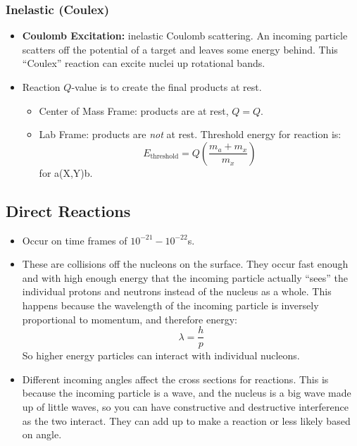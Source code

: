 \documentclass[letter]{article}
\begin{document}
\subsubsection{Inelastic (Coulex)}
\begin{itemize}
\item \textbf{Coulomb Excitation:} inelastic Coulomb
  scattering. An incoming particle scatters off the potential of a
  target and leaves some energy behind. This ``Coulex'' reaction can
  excite nuclei up rotational bands.~\cite[Lec. 24]{lecture}
\item Reaction $Q$-value is to create the final products at rest.
  \begin{itemize}
  \item Center of Mass Frame: products are at rest, $Q = Q$.
  \item Lab Frame: products are \textit{not} at rest. Threshold energy
    for reaction is:
    \begin{equation*}
      E_{\text{threshold}}=Q\left(\frac{m_a+m_x}{m_x}\right)
    \end{equation*}
    for a(X,Y)b.
  \end{itemize}
\end{itemize}

\subsection{Direct Reactions}

\begin{itemize}
\item Occur on time frames of $10^{-21}-10^{-22}$s.~\cite[Lec
  25]{lecture}
\item These are collisions off the nucleons on the surface. They occur
  fast enough and with high enough energy that the incoming particle actually ``sees'' the
  individual protons and neutrons instead of the nucleus as a
  whole. This happens because the wavelength of the incoming particle
  is inversely proportional to momentum, and therefore energy:
  \begin{equation*}
    \lambda = \frac{h}{p}
  \end{equation*}
  So higher energy particles can interact with individual
  nucleons.~\cite[Lec 25]{lecture}
\item Different incoming angles affect the cross sections for
  reactions. This is because the incoming particle is a wave, and the
  nucleus is a big wave made up of little waves, so you can have
  constructive and destructive interference as the two interact. They
  can add up to make a reaction or less likely based on
  angle.~\cite[Lec 25]{lecture}
\end{itemize}
\end{document}
